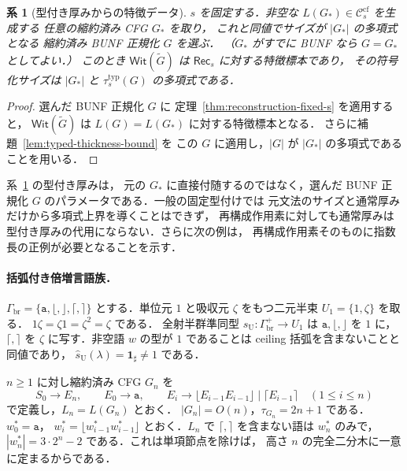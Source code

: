 \documentclass[11pt,a4paper]{ltjsarticle}
\newtheorem{corollary}[theorem]{系}
\theoremstyle{remark}
\theoremstyle{plain}
\newcommand{\WitnessSet}{\mathsf{Wit}}
\newcommand{\cf}{\mathrm{cf}}
\newcommand{\Ccf}[1]{\mathcal C_{#1}^{\cf}}
\begin{document}
\begin{corollary}[型付き厚みからの特徴データ]
\label{cor:typed-thickness-data}
$s$ を固定する．非空な $L(G_*)\in\Ccf{s}$ を生成する
任意の縮約済み CFG $G_*$ を取り，
これと同値でサイズが $|G_*|$ の多項式となる
縮約済み BUNF 正規化 $G$ を選ぶ．
（$G_*$ がすでに BUNF なら $G=G_*$ としてよい．）
このとき $\WitnessSet(\widetilde G)$ は
$\mathsf{Rec}_s$ に対する特徴標本であり，
その符号化サイズは $|G_*|$ と
$\tau_s^{\mathrm{typ}}(G)$ の多項式である．
\end{corollary}
\begin{proof}
選んだ BUNF 正規化 $G$ に
定理~\ref{thm:reconstruction-fixed-s} を適用すると，
$\WitnessSet(\widetilde G)$ は
$L(G)=L(G_*)$ に対する特徴標本となる．
さらに補題~\ref{lem:typed-thickness-bound} を
この $G$ に適用し，$|G|$ が
$|G_*|$ の多項式であることを用いる．
\end{proof}

系~\ref{cor:typed-thickness-data} の型付き厚みは，
元の $G_*$ に直接付随するのではなく，選んだ BUNF 正規化
$G$ のパラメータである．一般の固定型付けでは
元文法のサイズと通常厚みだけから多項式上界を導くことはできず，
再構成作用素に対しても通常厚みは型付き厚みの代用にならない．さらに次の例は，
再構成作用素そのものに指数長の正例が必要となることを示す．

\paragraph{括弧付き倍増言語族．}
$\Gamma_{\mathrm{br}}
=\{\mathtt a,\lfloor,\rfloor,\lceil,\rceil\}$
とする．単位元 $1$ と吸収元 $\zeta$ をもつ二元半束
$U_1=\{1,\zeta\}$ を取る．
$1\zeta=\zeta1=\zeta^2=\zeta$ である．
全射半群準同型 $s_{\mathrm U}:\Gamma_{\mathrm{br}}^+\to U_1$ は
$\mathtt a,\lfloor,\rfloor$ を $1$ に，
$\lceil,\rceil$ を $\zeta$ に写す．非空語 $w$ の型が $1$ であることは
ceiling 括弧を含まないことと同値であり，
$\widehat{s}_{\mathrm U}(\lambda)=\mathbf{1}_{\sharp}\ne1$ である．

$n\ge1$ に対し縮約済み CFG $G_n$ を
\[
 S_0\to E_n,\qquad E_0\to\mathtt a,\qquad
 E_i\to\lfloor{}E_{i-1}E_{i-1}\rfloor
       \mid\lceil{}E_{i-1}\rceil
 \quad(1\le i\le n)
\]
で定義し，$L_n=L(G_n)$ とおく．
$|G_n|=O(n)$，$\tau_{G_n}=2n+1$ である．
$w^*_0=\mathtt a$，
$w^*_i=\lfloor{}w^*_{i-1}w^*_{i-1}\rfloor$
とおく．$L_n$ で $\lceil,\rceil$ を含まない語は $w^*_n$ のみで，
$|w^*_n|=3\cdot2^n-2$ である．これは単項節点を除けば，
高さ $n$ の完全二分木に一意に定まるからである．
\end{document}
